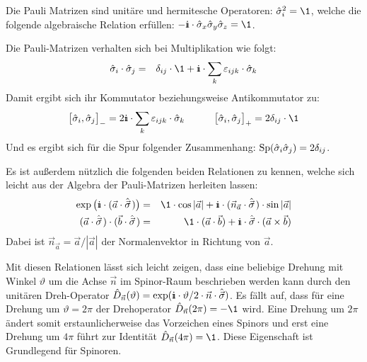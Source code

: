 \begin{itemize1}
	\item Die Pauli Matrizen sind unitäre und hermitesche Operatoren: $\hat{\sigma}_i^2=\1$, welche die folgende algebraische Relation erfüllen: $-\I\cdot \hat{\sigma}_x\hat{\sigma}_y\hat{\sigma}_z=\1$. 
	\item Die Pauli-Matrizen verhalten sich bei Multiplikation wie folgt: 
	\begin{eqnarray*}
		\hat{\sigma}_i\cdot\hat{\sigma}_j &=& \delta_{ij}\cdot \1+\I\cdot \sum_k \varepsilon_{ijk}\cdot\hat{\sigma}_k 
	\end{eqnarray*}
	Damit ergibt sich ihr Kommutator beziehungsweise Antikommutator zu: 
	\begin{eqnarray*}
		\big[\hat{\sigma}_i,\hat{\sigma}_j\big]_-=2\I\cdot\sum_k\varepsilon_{ijk}\cdot\hat{\sigma}_k &\qquad& \big[\hat{\sigma}_i,\hat{\sigma}_j\big]_+=2\delta_{ij}\cdot\1
	\end{eqnarray*}
	Und es ergibt sich für die Spur folgender Zusammenhang: $\text{Sp}(\hat{\sigma}_i\hat{\sigma}_j)=2\delta_{ij}$. 
	\item Es ist außerdem nützlich die folgenden beiden Relationen zu kennen, welche sich leicht aus der Algebra der Pauli-Matrizen herleiten lassen: 
	\begin{eqnarray*}
		\exp\big(\I\cdot(\vec{a}\cdot\hat{\vec{\sigma}}\;\!)\big) &=& \1\cdot \cos|\vec{a}|+\I\cdot (\vec{n}_{\vec{a}}\cdot \hat{\vec{\sigma}}\;\!)\cdot\sin|\vec{a}|
		\\
		(\vec{a}\cdot \hat{\vec{\sigma}}\;\!)\cdot(\vec{b}\cdot \hat{\vec{\sigma}}\;\!) &=& \1\cdot(\vec{a}\cdot\vec{b})+\I\cdot\hat{\vec{\sigma}}\cdot (\vec{a}\times\vec{b})
	\end{eqnarray*}
	Dabei ist $\vec{n}_{\vec{a}}=\vec{a}/|\vec{a}|$ der Normalenvektor in Richtung von $\vec{a}$. 
\end{itemize1}

Mit diesen Relationen lässt sich leicht zeigen, dass eine beliebige Drehung mit Winkel $\vartheta$ um die Achse $\vec{n}$ im Spinor-Raum beschrieben werden kann durch den unitären Dreh-Operator $\hat{D}_{\vec{n}}(\vartheta)=\exp(\I\cdot\vartheta/2\cdot \vec{n}\cdot\hat{\vec{\sigma}})$. Es fällt auf, dass für eine Drehung um $\vartheta=2\pi$ der Drehoperator $\hat{D}_{\vec{n}}(2\pi)=-\1$ wird. Eine Drehung um $2\pi$ ändert somit erstaunlicherweise das Vorzeichen eines Spinors und erst eine Drehung um $4\pi$ führt zur Identität $\hat{D}_{\vec{n}}(4\pi)=\1$. Diese Eigenschaft ist Grundlegend für Spinoren. 

